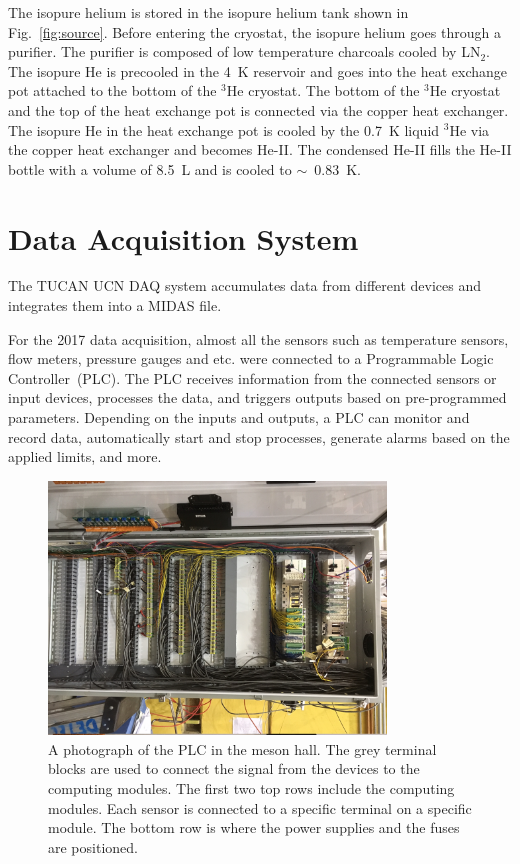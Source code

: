 The isopure helium is stored in the isopure helium tank shown in
Fig.~\ref{fig:source}. Before entering the cryostat, the isopure
helium goes through a purifier. The purifier is composed of low
temperature charcoals cooled by LN$_2$.  The isopure He is precooled
in the 4~K reservoir and goes into the heat exchange pot attached to
the bottom of the $^3$He cryostat. The bottom of the $^3$He cryostat
and the top of the heat exchange pot is connected via the copper heat
exchanger. The isopure He in the heat exchange pot is cooled by the
0.7~K liquid $^3$He via the copper heat exchanger and becomes
He-II. The condensed He-II fills the He-II bottle with a volume of
8.5~L and is cooled to $\sim$~0.83~K.




\section{Data Acquisition System\label{sec:DAQ}}
The TUCAN UCN DAQ system accumulates data from different devices and
integrates them into a MIDAS file.

For the 2017 data acquisition, almost all the sensors such as
temperature sensors, flow meters, pressure gauges and etc. were
connected to a Programmable Logic Controller~(PLC). The PLC receives
information from the connected sensors or input devices, processes the
data, and triggers outputs based on pre-programmed parameters.
Depending on the inputs and outputs, a PLC can monitor and record
data, automatically start and stop processes, generate alarms based on
the applied limits, and more.

\begin{figure}[h!]
  \centering
  \includegraphics[width=0.8\textwidth, angle = 90]{PLC.JPG}
  \caption[TUCAN's PLC in the meson hall]{A photograph of the PLC in
    the meson hall. The grey terminal blocks are used to connect the
    signal from the devices to the computing modules. The first two
    top rows include the computing modules. Each sensor is connected
    to a specific terminal on a specific module. The bottom row is
    where the power supplies and the fuses are positioned. }
  \label{fig:PLC}
\end{figure}

